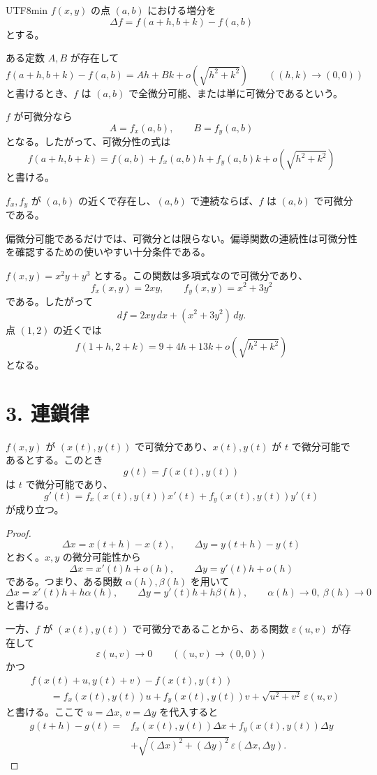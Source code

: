 \documentclass[a4paper,12pt]{article}
\begin{document}
\begin{CJK}{UTF8}{min}
$f(x,y)$ の点 $(a,b)$ における増分を
\[
\Delta f=f(a+h,b+k)-f(a,b)
\]
とする。
\begin{definition}
ある定数 $A,B$ が存在して
\[
f(a+h,b+k)-f(a,b)=Ah+Bk+o(\sqrt{h^2+k^2})
\qquad ((h,k)\to(0,0))
\]
と書けるとき、$f$ は $(a,b)$ で全微分可能、または単に可微分であるという。
\end{definition}

$f$ が可微分なら
\[
A=f_x(a,b),\qquad B=f_y(a,b)
\]
となる。したがって、可微分性の式は
\[
f(a+h,b+k)
=f(a,b)+f_x(a,b)h+f_y(a,b)k+o(\sqrt{h^2+k^2})
\]
と書ける。

\begin{theorem}[可微分性の十分条件]
$f_x,f_y$ が $(a,b)$ の近くで存在し、$(a,b)$ で連続ならば、$f$ は $(a,b)$ で可微分である。
\end{theorem}

\begin{remark}
偏微分可能であるだけでは、可微分とは限らない。偏導関数の連続性は可微分性を確認するための使いやすい十分条件である。
\end{remark}

\begin{example}
$f(x,y)=x^2y+y^3$ とする。この関数は多項式なので可微分であり、
\[
f_x(x,y)=2xy,\qquad f_y(x,y)=x^2+3y^2
\]
である。したがって
\[
df=2xy\,dx+(x^2+3y^2)\,dy.
\]
点 $(1,2)$ の近くでは
\[
f(1+h,2+k)
=9+4h+13k+o\left(\sqrt{h^2+k^2}\right)
\]
となる。
\end{example}

\section*{3. 連鎖律}

\begin{theorem}[曲線に沿う連鎖律]
$f(x,y)$ が $(x(t),y(t))$ で可微分であり、$x(t),y(t)$ が $t$ で微分可能であるとする。このとき
\[
g(t)=f(x(t),y(t))
\]
は $t$ で微分可能であり、
\[
\boxed{
g'(t)
=f_x(x(t),y(t))x'(t)
+f_y(x(t),y(t))y'(t)
}
\]
が成り立つ。
\end{theorem}

\begin{proof}
\[
\Delta x=x(t+h)-x(t),\qquad
\Delta y=y(t+h)-y(t)
\]
とおく。$x,y$ の微分可能性から
\[
\Delta x=x'(t)h+o(h),\qquad
\Delta y=y'(t)h+o(h)
\]
である。つまり、ある関数 $\alpha(h),\beta(h)$ を用いて
\[
\Delta x=x'(t)h+h\alpha(h),\qquad
\Delta y=y'(t)h+h\beta(h),
\qquad \alpha(h)\to0,\ \beta(h)\to0
\]
と書ける。

一方、$f$ が $(x(t),y(t))$ で可微分であることから、ある関数 $\varepsilon(u,v)$ が存在して
\[
\varepsilon(u,v)\to0\qquad ((u,v)\to(0,0))
\]
かつ
\[
\begin{aligned}
&f(x(t)+u,y(t)+v)-f(x(t),y(t))\\
&\qquad =f_x(x(t),y(t))u+f_y(x(t),y(t))v
+\sqrt{u^2+v^2}\,\varepsilon(u,v)
\end{aligned}
\]
と書ける。ここで $u=\Delta x$, $v=\Delta y$ を代入すると
\[
\begin{aligned}
g(t+h)-g(t)
={}&f_x(x(t),y(t))\Delta x
+f_y(x(t),y(t))\Delta y\\
&+\sqrt{(\Delta x)^2+(\Delta y)^2}\,\varepsilon(\Delta x,\Delta y).
\end{aligned}
\]


\end{proof}
\end{CJK}
\end{document}
